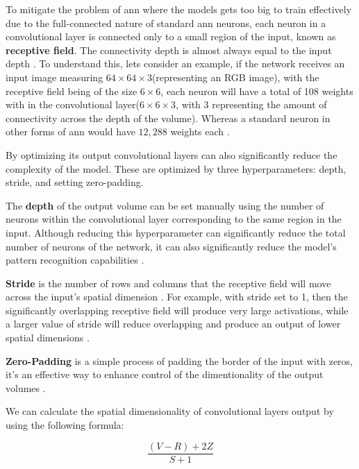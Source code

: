 To mitigate the problem of \gls{ann} where the models gets too big to train effectively due to the full-connected nature of standard \gls{ann} neurons, each neuron in a convolutional layer is connected only to a small region of the input, known as \textbf{receptive field}. The connectivity depth is almost always equal to the input depth \cite{oshea2015introductionconvolutionalneuralnetworks}. To understand this, lets consider an example, if the network receives an input image measuring $64\times64\times3$(representing an RGB image), with the receptive field being of the size $6\times6$, each neuron will have a total of 108 weights with in the convolutional layer($6\times6\times3$, with 3 representing the amount of connectivity across the depth of the volume). Whereas a standard neuron in other forms of \gls{ann} would have $12,288$ weights each \cite{oshea2015introductionconvolutionalneuralnetworks}.

By optimizing its output convolutional layers can also significantly reduce the complexity of the model. These are optimized by three hyperparameters: depth, stride, and setting zero-padding.

The \textbf{depth} of the output volume can be set manually using the number of neurons within the convolutional layer corresponding to the same region in the input. Although reducing this hyperparameter can significantly reduce the total number of neurons of the network, it can also significantly reduce the model's pattern recognition capabilities \cite{oshea2015introductionconvolutionalneuralnetworks}.


\textbf{Stride} is the number of rows and columns that the receptive field will move across the input's spatial dimension \cite{Zhao2024}. For example, with stride set to 1, then the significantly overlapping receptive field will produce very large activations, while a larger value of stride will reduce overlapping and produce an output of lower spatial dimensions \cite{oshea2015introductionconvolutionalneuralnetworks}.

\textbf{Zero-Padding} is a simple process of padding the border of the input with zeros, it's an effective way to enhance control of the dimentionality of the output volumes \cite{oshea2015introductionconvolutionalneuralnetworks}.

We can calculate the spatial dimensionality of convolutional layers output by using the following formula: 

\[
    \frac{(V - R) + 2Z}{S + 1}
\]

